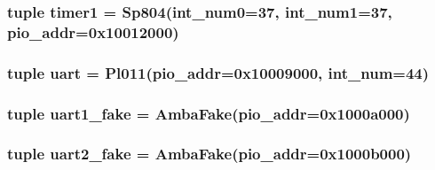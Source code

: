 \label{classRealView_1_1RealViewEB_af4ebf9ec12f4c51e9fd2eee3647a3932}
\hypertarget{classRealView_1_1RealViewEB_a43a269dacabf237422bf29f79e52a7e5}{
\subsubsection[{timer1}]{\setlength{\rightskip}{0pt plus 5cm}tuple {\bf timer1} = {\bf Sp804}(int\_\-num0=37, int\_\-num1=37, pio\_\-addr=0x10012000)}}
\label{classRealView_1_1RealViewEB_a43a269dacabf237422bf29f79e52a7e5}
\hypertarget{classRealView_1_1RealViewEB_a1f69fbabd17d6bca63f97f9754247cfd}{
\subsubsection[{uart}]{\setlength{\rightskip}{0pt plus 5cm}tuple {\bf uart} = {\bf Pl011}(pio\_\-addr=0x10009000, int\_\-num=44)}}
\label{classRealView_1_1RealViewEB_a1f69fbabd17d6bca63f97f9754247cfd}
\hypertarget{classRealView_1_1RealViewEB_ae8df5f47228f3c94133173ef497a4203}{
\subsubsection[{uart1\_\-fake}]{\setlength{\rightskip}{0pt plus 5cm}tuple {\bf uart1\_\-fake} = {\bf AmbaFake}(pio\_\-addr=0x1000a000)}}
\label{classRealView_1_1RealViewEB_ae8df5f47228f3c94133173ef497a4203}
\hypertarget{classRealView_1_1RealViewEB_a0c7e8be915fc7946adb67f2522bf26b1}{
\subsubsection[{uart2\_\-fake}]{\setlength{\rightskip}{0pt plus 5cm}tuple {\bf uart2\_\-fake} = {\bf AmbaFake}(pio\_\-addr=0x1000b000)}}
